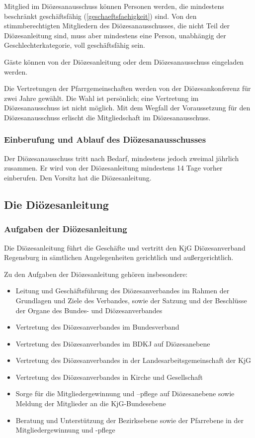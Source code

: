 \documentclass[12pt]{report}
\begin{document}
\begin{justify}
Mitglied im Diözesanausschuss können Personen werden, die mindestens beschränkt geschäftsfähig (\ref{geschaeftsfaehigkeit}) sind.
Von den stimmberechtigten Mitgliedern des Diözesanausschusses, die nicht Teil der Diözesanleitung sind,
muss aber mindestens eine Person, unabhängig der Geschlechterkategorie, voll geschäftsfähig sein.

Gäste können von der Diözesanleitung oder dem Diözesanausschuss eingeladen werden.

Die Vertretungen der Pfarrgemeinschaften werden von der Diözesankonferenz für zwei Jahre
gewählt. Die Wahl ist persönlich; eine Vertretung im Diözesanausschuss ist nicht möglich. Mit
dem Wegfall der Voraussetzung für den Diözesanausschuss erlischt die Mitgliedschaft im Diözesanausschuss.

\subsubsection{Einberufung und Ablauf des Diözesanausschusses}
Der Diözesanausschuss tritt nach Bedarf, mindestens jedoch zweimal jährlich zusammen. Er wird
von der Diözesanleitung mindestens 14 Tage vorher einberufen. Den Vorsitz hat die Diözesanleitung.

\subsection{Die Diözesanleitung}

\subsubsection{Aufgaben der Diözesanleitung}
Die Diözesanleitung führt die Geschäfte und vertritt den KjG Diözesanverband Regensburg in sämtlichen
Angelegenheiten gerichtlich und außergerichtlich.

Zu den Aufgaben der Diözesanleitung gehören insbesondere:
\begin{itemize}
  \item Leitung und Geschäftsführung des Diözesanverbandes im Rahmen der Grundlagen und Ziele
        des Verbandes, sowie der Satzung und der Beschlüsse der Organe des Bundes- und Diözesanverbandes
  \item Vertretung des Diözesanverbandes im Bundesverband
  \item Vertretung des Diözesanverbandes im BDKJ auf Diözesanebene
  \item Vertretung des Diözesanverbandes in der Landesarbeitsgemeinschaft der KjG
  \item Vertretung des Diözesanverbandes in Kirche und Gesellschaft
  \item Sorge für die Mitgliedergewinnung und –pflege auf Diözesanebene sowie
        Meldung der Mitglieder an die KjG-Bundesebene
  \item Beratung und Unterstützung der Bezirksebene sowie der Pfarrebene
        in der Mitgliedergewinnung und -pflege
\end{itemize}


\end{justify}
\end{document}
